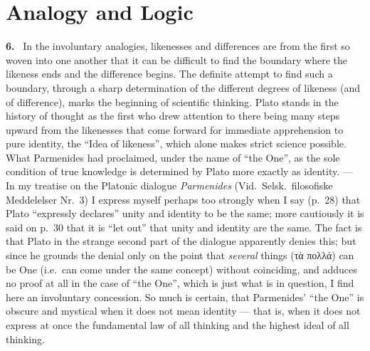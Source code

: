 \documentclass[12pt]{book}
\newcommand{\hnum}[1]{\noindent\textbf{#1.}~}
\newcommand{\opage}[1]{\marginnote{\footnotesize\textit{[#1]}}}
\begin{document}

\chapter{Analogy and Logic}
\label{ch:2}

\hnum{6} In the involuntary analogies, likenesses and differences are from the
first so woven into one another that it can be difficult to find the boundary
where the likeness ends and the difference begins. The definite attempt to find
such a boundary, through a sharp determination of the different degrees of
likeness (and of difference), marks the beginning of scientific thinking. Plato
stands in the history of thought as the first who drew attention to there being
many steps upward from the likenesses that come forward for immediate
apprehension to pure identity, the ``Idea of likeness'', which alone makes
strict science possible. What Parmenides had proclaimed, under the name of ``the
One'', as the sole condition of true knowledge is determined by Plato more
exactly as identity. --- In my treatise on the Platonic dialogue
\textit{Parmenides} (Vid.\ Selsk.\ filosofiske Meddelelser Nr.\ 3) I express
myself \opage{38}perhaps too strongly when I say (p.\ 28) that Plato ``expressly
declares'' unity and identity to be the same; more cautiously it is said on
p.\ 30 that it is ``let out'' that unity and identity are the same. The fact is
that Plato in the strange second part of the dialogue apparently denies this;
but since he grounds the denial only on the point that \textit{several} things
(τὰ πολλά) can be One (i.e.\ can come under the same concept) without
coinciding, and adduces no proof at all in the case of ``the One'', which is
just what is in question, I find here an involuntary concession. So much is
certain, that Parmenides' ``the One'' is obscure and mystical when it does not
mean identity --- that is, when it does not express at once the fundamental law
of all thinking and the highest ideal of all thinking.
\end{document}
